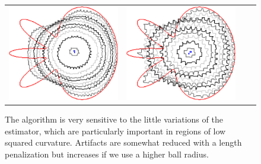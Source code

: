 \begin{figure}
\begin{tabular}{p{2.5em}ccc}
\includegraphics[scale=0.24]{figures/chapter6/radius-effect/flower/improve/len_pen0.5/radius-5/summary.pdf} &
\includegraphics[scale=0.24]{figures/chapter6/radius-effect/flower/improve/len_pen0.5/radius-9/summary.pdf}
\end{tabular}

\caption{The algorithm is very sensitive to the little variations of the estimator, which are particularly important in regions of low squared curvature. Artifacts are somewhat reduced with a length penalization but increases if we use a higher ball radius. }
\label{fig:m1-square-flow}
\end{figure}


